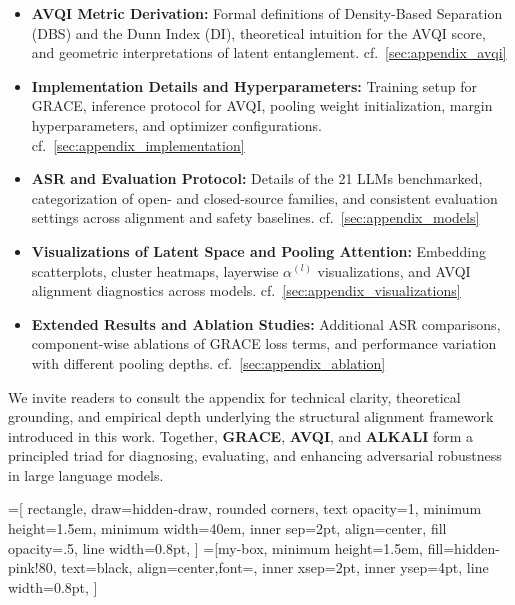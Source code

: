 \begin{itemize}
    \item \textbf{AVQI Metric Derivation:}  
    Formal definitions of Density-Based Separation (DBS) and the Dunn Index (DI), theoretical intuition for the AVQI score, and geometric interpretations of latent entanglement. cf.~\cref{sec:appendix_avqi}

    \item \textbf{Implementation Details and Hyperparameters:}  
    Training setup for GRACE, inference protocol for AVQI, pooling weight initialization, margin hyperparameters, and optimizer configurations. cf.~\cref{sec:appendix_implementation}

    \item \textbf{ASR and Evaluation Protocol:}  
    Details of the 21 LLMs benchmarked, categorization of open- and closed-source families, and consistent evaluation settings across alignment and safety baselines. cf.~\cref{sec:appendix_models}

    \item \textbf{Visualizations of Latent Space and Pooling Attention:}  
    Embedding scatterplots, cluster heatmaps, layerwise $\alpha^{(l)}$ visualizations, and AVQI alignment diagnostics across models. cf.~\cref{sec:appendix_visualizations}

    \item \textbf{Extended Results and Ablation Studies:}  
    Additional ASR comparisons, component-wise ablations of GRACE loss terms, and performance variation with different pooling depths. cf.~\cref{sec:appendix_ablation}

\end{itemize}

We invite readers to consult the appendix for technical clarity, theoretical grounding, and empirical depth underlying the structural alignment framework introduced in this work. Together, \textbf{GRACE}, \textbf{AVQI}, and \textbf{ALKALI} form a principled triad for diagnosing, evaluating, and enhancing adversarial robustness in large language models.















=[
    rectangle,
    draw=hidden-draw,
    rounded corners,
    text opacity=1,
    minimum height=1.5em,
    minimum width=40em,
    inner sep=2pt,
    align=center,
    fill opacity=.5,
    line width=0.8pt,
]
=[my-box, minimum height=1.5em,
    fill=hidden-pink!80, text=black, align=center,font=\normalsize,
    inner xsep=2pt,
    inner ysep=4pt,
    line width=0.8pt,
]

